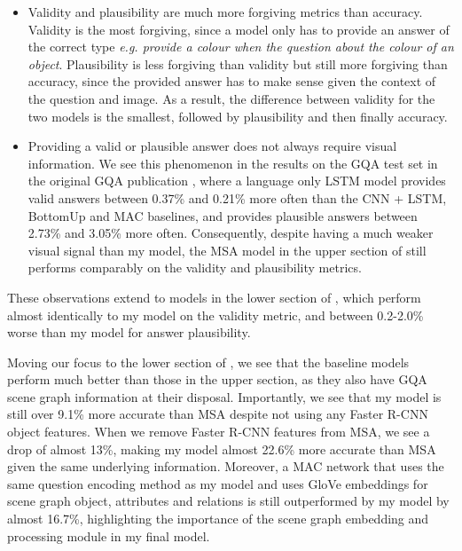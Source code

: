 \begin{itemize}
    \item Validity and plausibility are much more forgiving metrics than accuracy. Validity is the most forgiving, since a model only has to provide an answer of the correct type \textit{e.g. provide a colour when the question about the colour of an object}. Plausibility is less forgiving than validity but still more forgiving than accuracy, since the provided answer has to make sense given the context of the question and image. As a result, the difference between validity for the two models is the smallest, followed by plausibility and then finally accuracy.
    \item Providing a valid or plausible answer does not always require visual information. We see this phenomenon in the results on the GQA test set in the original GQA publication \cite{hudson2019gqa}, where a language only LSTM model provides valid answers between 0.37\% and 0.21\% more often than the CNN + LSTM, BottomUp \cite{anderson2018bottom} and MAC \cite{hudson2018compositional} baselines, and provides plausible answers between 2.73\% and 3.05\% more often. Consequently, despite having a much weaker visual signal than my model, the MSA model in the upper section of \tableautorefname{ \ref{table:performance_comparison}} still performs comparably on the validity and plausibility metrics.
\end{itemize}

These observations extend to models in the lower section of \tableautorefname{ \ref{table:performance_comparison}}, which perform almost identically to my model on the validity metric, and between 0.2-2.0\% worse than my model for answer plausibility.

Moving our focus to the lower section of \tableautorefname{ \ref{table:performance_comparison}}, we see that the baseline models perform much better than those in the upper section, as they also have GQA scene graph information at their disposal. Importantly, we see that my model is still over 9.1\% more accurate than MSA despite not using any Faster R-CNN object features. When we remove Faster R-CNN features from MSA, we see a drop of almost 13\%, making my model almost 22.6\% more accurate than MSA given the same underlying information. Moreover, a MAC network that uses the same question encoding method as my model and uses GloVe embeddings for scene graph object, attributes and relations is still outperformed by my model by almost 16.7\%, highlighting the importance of the scene graph embedding and processing module in my final model.


